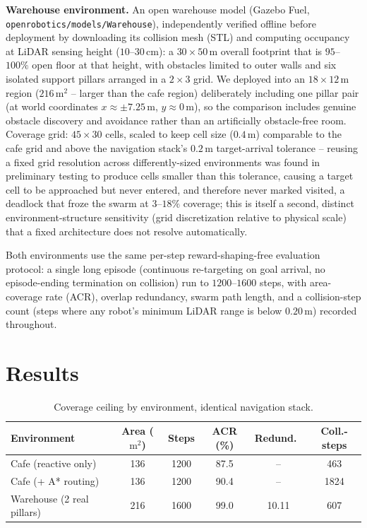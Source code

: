 \documentclass[12pt]{article}
\newcommand{\si}[1]{\mathrm{#1}}
\begin{document}
\textbf{Warehouse environment.} An open warehouse model (Gazebo Fuel,
\texttt{openrobotics/models/Warehouse}), independently verified offline
before deployment by downloading its collision mesh (STL) and computing
occupancy at LiDAR sensing height ($10$--$30\,\si{cm}$): a $30\times50\,$m
overall footprint that is $95$--$100\%$ open floor at that height, with
obstacles limited to outer walls and six isolated support pillars arranged in
a $2\times3$ grid. We deployed into an $18\times12\,$m region ($216\,\si{m}^2$
-- larger than the cafe region) deliberately including one pillar pair (at
world coordinates $x\approx\pm7.25\,$m, $y\approx0\,$m), so the comparison
includes genuine obstacle discovery and avoidance rather than an artificially
obstacle-free room. Coverage grid: $45\times30$ cells, scaled to keep cell
size ($0.4\,$m) comparable to the cafe grid and above the navigation stack's
$0.2\,$m target-arrival tolerance -- reusing a fixed grid resolution across
differently-sized environments was found in preliminary testing to produce
cells smaller than this tolerance, causing a target cell to be approached but
never entered, and therefore never marked visited, a deadlock that froze the
swarm at $3$--$18\%$ coverage; this is itself a second, distinct
environment-structure sensitivity (grid discretization relative to physical
scale) that a fixed architecture does not resolve automatically.

Both environments use the same per-step reward-shaping-free evaluation
protocol: a single long episode (continuous re-targeting on goal arrival, no
episode-ending termination on collision) run to $1200$--$1600$ steps, with
area-coverage rate (ACR), overlap redundancy, swarm path length, and a
collision-step count (steps where any robot's minimum LiDAR range is below
$0.20\,$m) recorded throughout.

\section{Results}
\begin{table}[h]
\centering
\caption{Coverage ceiling by environment, identical navigation stack.}
\label{tab:results}
\begin{tabular}{@{}lccccc@{}}
\toprule
Environment & Area ($\si{m}^2$) & Steps & ACR (\%) & Redund.\ & Coll.-steps \\
\midrule
Cafe (reactive only)        & 136 & 1200 & 87.5 & --    & 463  \\
Cafe (+ A* routing)         & 136 & 1200 & 90.4 & --    & 1824 \\
Warehouse (2 real pillars)  & 216 & 1600 & 99.0 & 10.11 & 607  \\
\bottomrule
\end{tabular}
\end{table}
\end{document}
